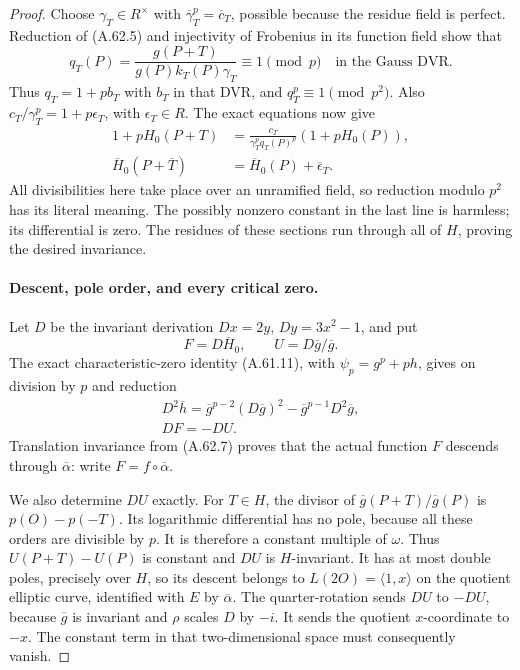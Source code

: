 \begin{proof}
Choose \(\gamma_T\in R^\times\) with
\(\overline\gamma_T^p=\overline c_T\), possible
because the residue field is perfect. Reduction of
(A.62.5) and injectivity of Frobenius in its function
field show that
\[
 q_T(P)=\frac{g(P+T)}{g(P)k_T(P)\gamma_T}
                  \equiv1\pmod p
                       \quad\text{in the Gauss DVR}.
                                                        \tag{A.62.6}
\]
Thus \(q_T=1+pb_T\) with \(b_T\) in that DVR, and
\(q_T^p\equiv1\pmod{p^2}\). Also
\(c_T/\gamma_T^p=1+p\epsilon_T\), with
\(\epsilon_T\in R\). The exact equations now give
\[
 \begin{aligned}
 1+pH_0(P+T)
   &=\frac{c_T}{\gamma_T^p q_T(P)^p}(1+pH_0(P)),\\
 \overline H_0(P+\overline T)
   &=\overline H_0(P)+\overline\epsilon_T.
 \end{aligned}
                                                        \tag{A.62.7}
\]
All divisibilities here take place over an unramified
field, so reduction modulo \(p^2\) has its literal
meaning. The possibly nonzero constant in the last
line is harmless; its differential is zero.
The residues of these sections run through all of
\(H\), proving the desired invariance.

\paragraph{Descent, pole order, and every critical zero.}
Let \(D\) be the invariant derivation
\(Dx=2y\), \(Dy=3x^2-1\), and put
\[
        F=D\overline H_0,
        \qquad U=D\overline g/\overline g.
                                                        \tag{A.62.8}
\]
The exact characteristic-zero identity (A.61.11), with
\(\psi_p=g^p+ph\), gives on division by \(p\) and
reduction
\[
 \begin{gathered}
 D^2\overline h
   =\overline g^{p-2}(D\overline g)^2
      -\overline g^{p-1}D^2\overline g,\\
 DF=-DU.
 \end{gathered}                       \tag{A.62.9}
\]
Translation invariance from (A.62.7) proves that the
actual function \(F\) descends through
\(\overline\alpha\): write \(F=f\circ\overline\alpha\).

We also determine \(DU\) exactly. For \(T\in H\),
the divisor of \(\overline g(P+T)/\overline g(P)\)
is \(p(O)-p(-T)\). Its logarithmic differential has
no pole, because all these orders are divisible by
\(p\). It is therefore a constant multiple of
\(\omega\). Thus \(U(P+T)-U(P)\) is constant and
\(DU\) is \(H\)-invariant. It has at most double
poles, precisely over \(H\), so its descent belongs
to \(L(2O)=\langle1,x\rangle\) on the quotient elliptic
curve, identified with \(E\) by \(\overline\alpha\).
The quarter-rotation sends \(DU\) to \(-DU\),
because \(\overline g\) is invariant and \(\rho\)
scales \(D\) by \(-i\). It sends the quotient
\(x\)-coordinate to \(-x\). The constant term in
that two-dimensional space must consequently vanish.


\end{proof}
